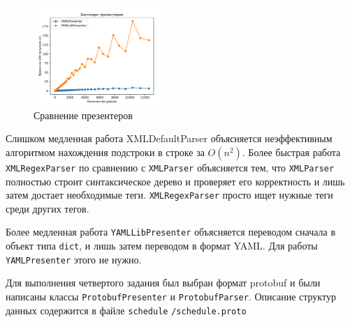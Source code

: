 \begin{figure}[ht]
    \centering
    \includegraphics[width=0.45\textwidth]{img/benchmark_p.pdf}
    \caption{Сравнение презентеров}
    \label{fig:presenters}
\end{figure}

Слишком медленная работа XMLDefaultParser объясняется неэффективным алгоритмом нахождения подстроки в строке за $O(n^2)$.
Более быстрая работа \texttt{XMLRegexParser} по сравнению с \texttt{XMLParser} объясняется тем, что \texttt{XMLParser} полностью строит синтаксическое дерево
и проверяет его корректность и лишь затем достает необходимые теги. \texttt{XMLRegexParser} просто ищет нужные теги среди других тегов.

Более медленная работа \texttt{YAMLLibPresenter} объясняется переводом сначала в объект типа \texttt{dict}, и лишь затем переводом в формат YAML.
Для работы \texttt{YAMLPresenter} этого не нужно.

Для выполнения четвертого задания был выбран формат protobuf и были написаны классы \texttt{ProtobufPresenter} и \texttt{ProtobufParser}.
Описание структур данных содержится в файле \texttt{schedule} \texttt{/schedule.proto}
